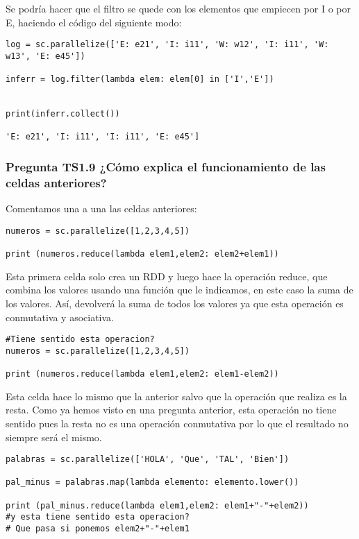 \documentclass[11pt]{article}
\begin{document}
{{Se podría hacer que el filtro se quede con los elementos que empiecen por I o por E, haciendo el código del siguiente modo:

\begin{verbatim}
log = sc.parallelize(['E: e21', 'I: i11', 'W: w12', 'I: i11', 'W: w13', 'E: e45'])

inferr = log.filter(lambda elem: elem[0] in ['I','E'])


print(inferr.collect())

'E: e21', 'I: i11', 'I: i11', 'E: e45']

\end{verbatim}
\subsubsection*{ Pregunta TS1.9 ¿Cómo explica el funcionamiento de las celdas anteriores?}

Comentamos una a una las celdas anteriores:

\begin{verbatim}
numeros = sc.parallelize([1,2,3,4,5])

print (numeros.reduce(lambda elem1,elem2: elem2+elem1))
\end{verbatim}

Esta primera celda solo crea un RDD y luego hace la operación reduce, que combina los valores usando una función que le indicamos, en este caso la suma de los valores. Así, devolverá la suma de todos los valores ya que esta operación es conmutativa y asociativa.


\begin{verbatim}
#Tiene sentido esta operacion?
numeros = sc.parallelize([1,2,3,4,5])

print (numeros.reduce(lambda elem1,elem2: elem1-elem2))
\end{verbatim}

Esta celda hace lo mismo que la anterior salvo que la operación que realiza es la resta. Como ya hemos visto en una pregunta anterior, esta operación no tiene sentido pues la resta no es una operación conmutativa por lo que el resultado no siempre será el mismo.

\begin{verbatim}
palabras = sc.parallelize(['HOLA', 'Que', 'TAL', 'Bien'])

pal_minus = palabras.map(lambda elemento: elemento.lower())

print (pal_minus.reduce(lambda elem1,elem2: elem1+"-"+elem2))
#y esta tiene sentido esta operacion?
# Que pasa si ponemos elem2+"-"+elem1
\end{verbatim}

}}
\end{document}
